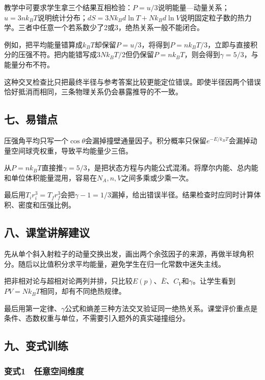 \documentclass[12pt,a4paper,fontset=fandol]{ctexart}
\begin{document}
教学中可要求学生拿三个结果互相检验：\(P=u/3\)说明能量---动量关系；\(u=3nk_BT\)说明统计分布；\(dS=3Nk_Bd\ln T+Nk_Bd\ln V\)说明固定粒子数的热力学。三者中任意一个若系数少了2或3，绝热关系一般不能闭合。

例如，把平均能量错算成\(k_BT\)却保留\(P=u/3\)，将得到\(P=nk_BT/3\)，立即与直接积分的压强不符。把内能错写成\(3Nk_BT/2\)但仍保留\(P=nk_BT\)，则会得到\(\gamma=5/3\)，与能量分布不符。

这种交叉检查比只把最终半径与参考答案比较更能定位错误。即使半径因两个错误恰好抵消而相同，三条物理关系仍会暴露推导的不一致。

\subsection{七、易错点}\label{ux4e03ux6613ux9519ux70b9-6}

压强角平均只写一个\(\cos\theta\)会漏掉撞壁通量因子。积分概率只保留\(e^{-E/k_BT}\)会漏掉动量空间球壳权重，导致平均能量少三倍。

从\(P=nk_BT\)直接推\(\gamma=5/3\)，是把状态方程与内能公式混淆。将摩尔内能、总内能和单位体积能量混用，容易在\(N_A,n,V\)之间多乘或少乘一次。

最后用\(T_ir_i^3=T_fr_f^3\)会把\(\gamma-1=1/3\)漏掉，给出错误半径。结果检查时应同时计算体积、密度和压强比例。

\subsection{八、课堂讲解建议}\label{ux516bux8bfeux5802ux8bb2ux89e3ux5efaux8bae-6}

先从单个斜入射粒子的动量交换出发，画出两个余弦因子的来源，再做半球角积分。随后以比值积分求平均能量，避免学生在归一化常数中迷失主线。

把非相对论与超相对论两列并排，只比较\(E(p)\)、\(\bar E\)、\(C_V\)和\(\gamma\)。让学生看到\(PV=Nk_BT\)相同，却有不同绝热规律。

最后用第一定律、\(\gamma\)公式和熵差三种方法交叉验证同一绝热关系。课堂评价重点是条件、态数权重与单位，不需要引入题外的真实碰撞组分。

\subsection{九、变式训练}\label{ux4e5dux53d8ux5f0fux8badux7ec3-6}

\subsubsection{变式1　任意空间维度}\label{ux53d8ux5f0f1-ux4efbux610fux7a7aux95f4ux7ef4ux5ea6}
\end{document}
